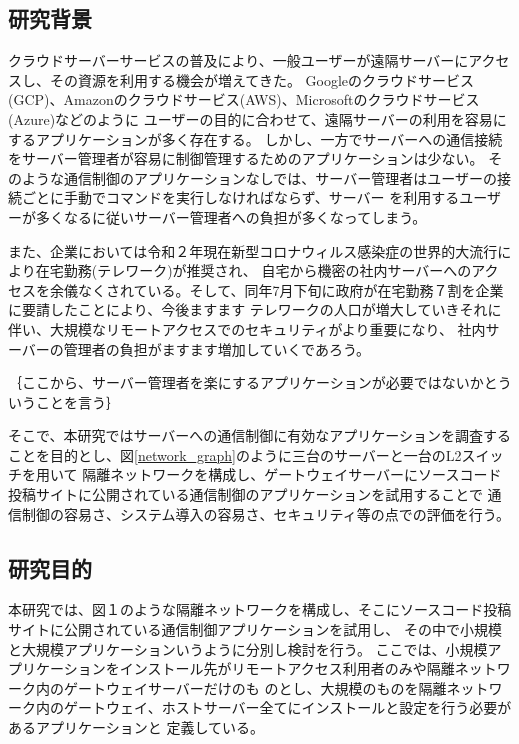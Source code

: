 \documentclass[12pt,a4paper,titlepage]{jsarticle}
\begin{document}
\subsection{研究背景}
クラウドサーバーサービスの普及により、一般ユーザーが遠隔サーバーにアクセスし、その資源を利用する機会が増えてきた。
Googleのクラウドサービス(GCP)、Amazonのクラウドサービス(AWS)、Microsoftのクラウドサービス(Azure)などのように
ユーザーの目的に合わせて、遠隔サーバーの利用を容易にするアプリケーションが多く存在する。
しかし、一方でサーバーへの通信接続をサーバー管理者が容易に制御管理するためのアプリケーションは少ない。
そのような通信制御のアプリケーションなしでは、サーバー管理者はユーザーの接続ごとに手動でコマンドを実行しなければならず、サーバー
を利用するユーザーが多くなるに従いサーバー管理者への負担が多くなってしまう。\par
また、企業においては令和２年現在新型コロナウィルス感染症の世界的大流行により在宅勤務(テレワーク)が推奨され、
自宅から機密の社内サーバーへのアクセスを余儀なくされている。そして、同年7月下旬に政府が在宅勤務７割を企業に要請したことにより、今後ますます
テレワークの人口が増大していきそれに伴い、大規模なリモートアクセスでのセキュリティがより重要になり、
社内サーバーの管理者の負担がますます増加していくであろう。\par 

｛ここから、サーバー管理者を楽にするアプリケーションが必要ではないかとういうことを言う｝

そこで、本研究ではサーバーへの通信制御に有効なアプリケーションを調査することを目的とし、図\ref{network_graph}のように三台のサーバーと一台のL2スイッチを用いて
隔離ネットワークを構成し、ゲートウェイサーバーにソースコード投稿サイトに公開されている通信制御のアプリケーションを試用することで
通信制御の容易さ、システム導入の容易さ、セキュリティ等の点での評価を行う。



\subsection{研究目的}
本研究では、図１のような隔離ネットワークを構成し、そこにソースコード投稿サイトに公開されている通信制御アプリケーションを試用し、
その中で小規模と大規模アプリケーションいうように分別し検討を行う。
ここでは、小規模アプリケーションをインストール先がリモートアクセス利用者のみや隔離ネットワーク内のゲートウェイサーバーだけのも
のとし、大規模のものを隔離ネットワーク内のゲートウェイ、ホストサーバー全てにインストールと設定を行う必要があるアプリケーションと
定義している。
\end{document}
